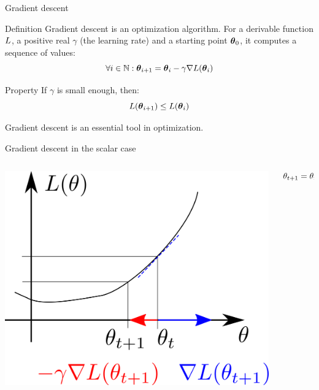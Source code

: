 \documentclass[xcolor=pdftex,dvipsnames,table,mathserif]{beamer}
\begin{document}
\begin{frame}{Gradient descent}

\begin{block}{Definition}
  Gradient descent is an optimization algorithm. For a derivable function $L$, a positive real $\gamma$ (the \alert{learning rate}) and a starting point $\boldsymbol{\theta}_0$, it computes a sequence of values:
  \[
  \forall i \in \mathbb{N}: \boldsymbol{\theta}_{i+1} = \boldsymbol{\theta}_i - \gamma \nabla L(\boldsymbol{\theta}_i)
  \]
\end{block}

\begin{block}{Property}
  If $\gamma$ is small enough, then:
  \[
  L(\boldsymbol{\theta}_{i+1}) \leq L(\boldsymbol{\theta}_i)
  \]
\end{block}

Gradient descent is an essential tool in optimization.

\end{frame}

\begin{frame}{Gradient descent in the scalar case}

\begin{columns}
  \begin{column}{.5\textwidth}
    \includegraphics[width=\textwidth]{../graphics/gradient_descent}
  \end{column}

  \begin{column}{.5\textwidth}
    \[
    \theta_{t+1} = \theta_t - \gamma\nabla L(\theta_t)
    \]
  \end{column}
\end{columns}

\end{frame}
\end{document}
